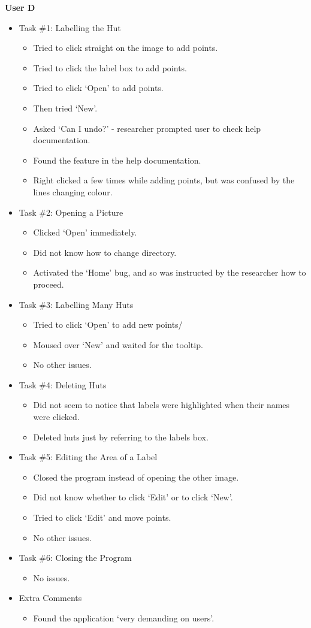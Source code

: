 \documentclass[11pt,twocolumn]{article}
\begin{document}
\textbf{User D}
\begin{itemize}
\item Task \#1: Labelling the Hut
\begin{itemize}
\item Tried to click straight on the image to add points.
\item Tried to click the label box to add points.
\item Tried to click `Open' to add points.
\item Then tried `New'.
\item Asked `Can I undo?' - researcher prompted user to check help documentation.
\item Found the feature in the help documentation.
\item Right clicked a few times while adding points, but was confused by the lines changing colour.
\end{itemize}
\item Task \#2: Opening a Picture
\begin{itemize}
\item Clicked `Open' immediately.
\item Did not know how to change directory.
\item Activated the `Home' bug, and so was instructed by the researcher how to proceed.
\end{itemize}
\item Task \#3: Labelling Many Huts
\begin{itemize}
\item Tried to click `Open' to add new points/
\item Moused over `New' and waited for the tooltip.
\item No other issues.
\end{itemize}
\item Task \#4: Deleting Huts
\begin{itemize}
\item Did not seem to notice that labels were highlighted when their names were clicked.
\item Deleted huts just by referring to the labels box.
\end{itemize}
\item Task \#5: Editing the Area of a Label
\begin{itemize}
\item Closed the program instead of opening the other image.
\item Did not know whether to click `Edit' or to click `New'.
\item Tried to click `Edit' and move points.
\item No other issues.
\end{itemize}
\item Task \#6: Closing the Program
\begin{itemize}
\item No issues.
\end{itemize}
\item Extra Comments
\begin{itemize}
\item Found the application `very demanding on users'.
\end{itemize}
\end{itemize}
\end{document}
